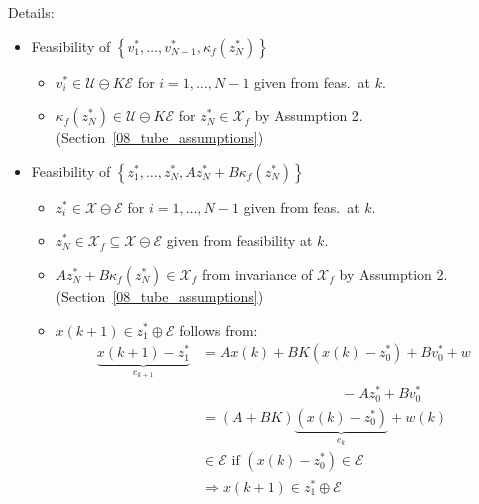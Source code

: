 \begin{examplesection}
    \newpar{}
    Details:
    \begin{itemize}
        \item Feasibility of $\left\{ v_1^*, \dots, v_{N-1}^*, \kappa_f(z_N^*) \right\}$
              \begin{itemize}
                  \item $v_i^* \in \mathcal{U} \ominus K\mathcal{E}$ for $i=1,\ldots,N-1$ given from feas.\ at $k$.
                  \item $\kappa_f(z_N^*) \in \mathcal{U} \ominus K\mathcal{E}$ for $z_N^*\in\mathcal{X}_f$ by Assumption 2. (Section~\ref{08_tube_assumptions})
              \end{itemize}
        \item Feasibility of $\left\{ z_1^*, \dots, z_N^*, A z_N^* + B \kappa_f(z_N^*) \right\}$
              \begin{itemize}
                  \item $z_i^* \in \mathcal{X}\ominus\mathcal{E}$ for $i=1,\ldots,N-1$ given from feas.\ at $k$.
                  \item $z_N^* \in \mathcal{X}_f\subseteq\mathcal{X}\ominus\mathcal{E}$ given from feasibility at $k$.
                  \item $Az_N^* + B\kappa_f(z_N^*) \in \mathcal{X}_f$ from invariance of $\mathcal{X}_f$ by Assumption 2. (Section~\ref{08_tube_assumptions})
                  \item $x(k+1) \in z_1^* \oplus \mathcal{E}$ follows from:
                        \begin{align*}
                            \underbrace{x(k+1) -z_1^*}_{e_{k+1}} & = Ax(k) +BK(x(k)-z_0^*)+Bv_0^* + w                      \\
                                                                 & \qquad\qquad\qquad\qquad\qquad -Az_0^* + Bv_0^*         \\
                                                                 & = (A+BK)\underbrace{(x(k)-z_0^*)}_{e_k} + w(k)          \\
                                                                 & \in \mathcal{E} \text{ if } (x(k)-z_0^*)\in \mathcal{E} \\
                                                                 & \Rightarrow x(k+1) \in z_1^* \oplus \mathcal{E}
                        \end{align*}
              \end{itemize}
    \end{itemize}
    \newpar{}


\end{examplesection}
